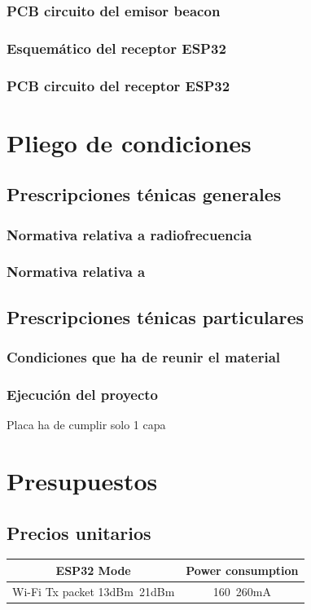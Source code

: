 \documentclass[a4paper ,12pt, onecolumn]{article}
\begin{document}
        \subsubsection{PCB circuito del emisor beacon}
        \subsubsection{Esquemático del receptor ESP32}
        \subsubsection{PCB circuito del receptor ESP32}
\section{Pliego de condiciones}
    \subsection{Prescripciones ténicas generales}
        \subsubsection{Normativa relativa a radiofrecuencia}
        \subsubsection{Normativa relativa a }
    \subsection{Prescripciones ténicas particulares}
        \subsubsection{Condiciones que ha de reunir el material}
        \subsubsection{Ejecución del proyecto}
        Placa ha de cumplir solo 1 capa
\section{Presupuestos}
    \subsection{Precios unitarios}
        \begin{center}
            \begin{tabular}{||c | c ||} 
            \hline
            ESP32 Mode & Power consumption  \\ [0.5ex] 
            \hline\hline
            Wi-Fi Tx packet 13dBm~21dBm & 160~260mA  \\ 
            \hline
            \end{tabular}
        \end{center}
\end{document}
